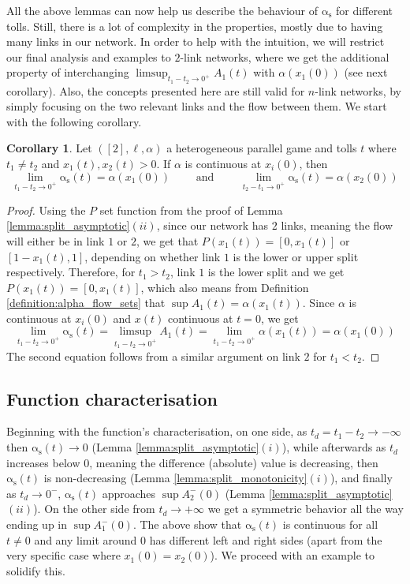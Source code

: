 \documentclass[10pt,a4paper]{book}
\newcommand{\as}{\mathrm{\alpha_s}}
\theoremstyle{definition}
\newtheorem{corollary}[definition]{Corollary}
\theoremstyle{comment}
\begin{document}
All the above lemmas can now help us describe the behaviour of $\as$ for different tolls.
Still, there is a lot of complexity in the properties, mostly due to having many links in our network.
In order to help with the intuition, we will restrict our final analysis and examples to $2$-link networks, where we get the additional property of interchanging $\limsup_{t_1 - t_2 \rightarrow 0^+} A_1(t)$ with $\alpha(x_1(0))$ (see next corollary).
Also, the concepts presented here are still valid for $n$-link networks, by simply focusing on the two relevant links and the flow between them.
We start with the following corollary.

\begin{corollary}
	\label{corollary:split_asymptotic_continuous}
	Let $([2], \ell, \alpha)$ a heterogeneous parallel game and tolls $t$ where $t_1 \ne t_2$ and $x_1(t), x_2(t) > 0$.
	If $\alpha$ is continuous at $x_i(0)$, then
	\[
		\lim_{t_1 - t_2 \rightarrow 0^+} \as(t) = \alpha(x_1(0)) \qquad \text{ and } \qquad \lim_{t_2 - t_1 \rightarrow 0^+} \as(t) = \alpha(x_2(0))
	\]
\end{corollary}

\begin{proof}
	Using the $P$ set function from the proof of Lemma \ref{lemma:split_asymptotic}$(ii)$, since our network has $2$ links, meaning the flow will either be in link $1$ or $2$, we get that $P(x_1(t)) = [0, x_1(t)]$ or $[1 - x_1(t), 1]$, depending on whether link $1$ is the lower or upper split respectively.
	Therefore, for $t_1 > t_2$, link $1$ is the lower split and we get $P(x_1(t)) = [0, x_1(t)]$, which also means from Definition \ref{definition:alpha_flow_sets} that $\sup A_1(t) = \alpha(x_1(t))$.
	Since $\alpha$ is continuous at $x_i(0)$ and $x(t)$ continuous at $t = 0$, we get
	\[
		\lim_{t_1 - t_2 \rightarrow 0^+} \as(t) = \limsup_{t_1 - t_2 \rightarrow 0^+} A_1(t) = \lim_{t_1 - t_2 \rightarrow 0^+} \alpha(x_1(t)) = \alpha(x_1(0))
	\]
	The second equation follows from a similar argument on link $2$ for $t_1 < t_2$.
\end{proof}

\subsection{Function characterisation}

Beginning with the function's characterisation, on one side, as $t_d = t_1 - t_2 \rightarrow -\infty$ then $\as(t) \rightarrow 0$ (Lemma \ref{lemma:split_asymptotic}$(i)$), while afterwards as $t_d$ increases below $0$, meaning the difference (absolute) value is decreasing, then $\as(t)$ is non-decreasing (Lemma \ref{lemma:split_monotonicity}$(i)$), and finally as $t_d \rightarrow 0^-$, $\as(t)$ approaches $\sup A_2^-(0)$ (Lemma \ref{lemma:split_asymptotic}$(ii)$).
On the other side from $t_d \rightarrow +\infty$ we get a symmetric behavior all the way ending up in $\sup A_1^-(0)$.
The above show that $\as(t)$ is continuous for all $t \ne 0$ and any limit around $0$ has different left and right sides (apart from the very specific case where $x_1(0) = x_2(0)$).
We proceed with an example to solidify this.
\end{document}
